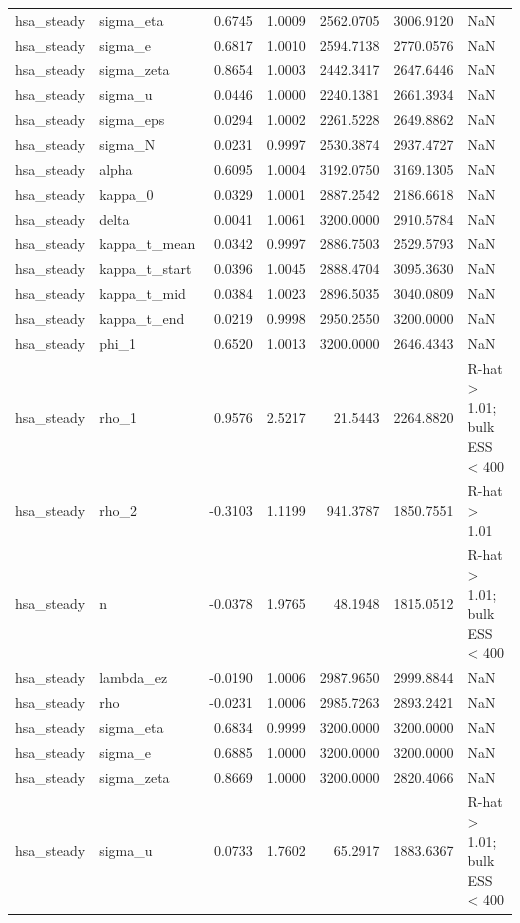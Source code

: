 \begin{tabular}{llrrrrl}
hsa\_steady & sigma\_eta & 0.6745 & 1.0009 & 2562.0705 & 3006.9120 & NaN \\
hsa\_steady & sigma\_e & 0.6817 & 1.0010 & 2594.7138 & 2770.0576 & NaN \\
hsa\_steady & sigma\_zeta & 0.8654 & 1.0003 & 2442.3417 & 2647.6446 & NaN \\
hsa\_steady & sigma\_u & 0.0446 & 1.0000 & 2240.1381 & 2661.3934 & NaN \\
hsa\_steady & sigma\_eps & 0.0294 & 1.0002 & 2261.5228 & 2649.8862 & NaN \\
hsa\_steady & sigma\_N & 0.0231 & 0.9997 & 2530.3874 & 2937.4727 & NaN \\
hsa\_steady & alpha & 0.6095 & 1.0004 & 3192.0750 & 3169.1305 & NaN \\
hsa\_steady & kappa\_0 & 0.0329 & 1.0001 & 2887.2542 & 2186.6618 & NaN \\
hsa\_steady & delta & 0.0041 & 1.0061 & 3200.0000 & 2910.5784 & NaN \\
hsa\_steady & kappa\_t\_mean & 0.0342 & 0.9997 & 2886.7503 & 2529.5793 & NaN \\
hsa\_steady & kappa\_t\_start & 0.0396 & 1.0045 & 2888.4704 & 3095.3630 & NaN \\
hsa\_steady & kappa\_t\_mid & 0.0384 & 1.0023 & 2896.5035 & 3040.0809 & NaN \\
hsa\_steady & kappa\_t\_end & 0.0219 & 0.9998 & 2950.2550 & 3200.0000 & NaN \\
hsa\_steady & phi\_1 & 0.6520 & 1.0013 & 3200.0000 & 2646.4343 & NaN \\
hsa\_steady & rho\_1 & 0.9576 & 2.5217 & 21.5443 & 2264.8820 & R-hat > 1.01; bulk ESS < 400 \\
hsa\_steady & rho\_2 & -0.3103 & 1.1199 & 941.3787 & 1850.7551 & R-hat > 1.01 \\
hsa\_steady & n & -0.0378 & 1.9765 & 48.1948 & 1815.0512 & R-hat > 1.01; bulk ESS < 400 \\
hsa\_steady & lambda\_ez & -0.0190 & 1.0006 & 2987.9650 & 2999.8844 & NaN \\
hsa\_steady & rho & -0.0231 & 1.0006 & 2985.7263 & 2893.2421 & NaN \\
hsa\_steady & sigma\_eta & 0.6834 & 0.9999 & 3200.0000 & 3200.0000 & NaN \\
hsa\_steady & sigma\_e & 0.6885 & 1.0000 & 3200.0000 & 3200.0000 & NaN \\
hsa\_steady & sigma\_zeta & 0.8669 & 1.0000 & 3200.0000 & 2820.4066 & NaN \\
hsa\_steady & sigma\_u & 0.0733 & 1.7602 & 65.2917 & 1883.6367 & R-hat > 1.01; bulk ESS < 400 \\

\end{tabular}

